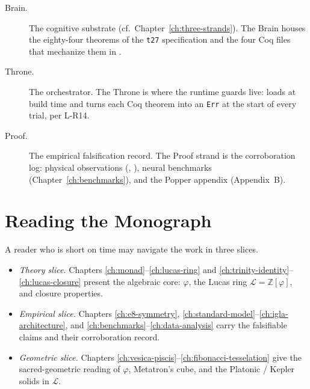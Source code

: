 \begin{description}
  \item[Brain.] The cognitive substrate (cf.\ Chapter~\ref{ch:three-strands}).
        The Brain houses the eighty-four theorems of the
        \texttt{t27} specification \cite{t27spec} and the four Coq
        files that mechanize them in
        \href{https://github.com/gHashTag/trinity-clara/tree/main/proofs/igla}{}.
  \item[Throne.] The orchestrator. The Throne is where the runtime
        guards live: 
        loads  at build time
        and turns each Coq theorem into an \texttt{Err} at the start
        of every trial, per L-R14.
  \item[Proof.] The empirical falsification record. The Proof strand
        is the corroboration log: physical observations
        (\citealp{coldea2010}, \citealp{shechtman1984}), neural
        benchmarks (Chapter~\ref{ch:benchmarks}), and the Popper
        appendix (Appendix~B).
\end{description}

\section{Reading the Monograph}

A reader who is short on time may navigate the work in three slices.

\begin{itemize}
  \item \emph{Theory slice.} Chapters \ref{ch:monad}--\ref{ch:lucas-ring}
        and \ref{ch:trinity-identity}--\ref{ch:lucas-closure} present
        the algebraic core: \(\varphi\), the Lucas ring \(\mathcal{L} = \mathbb{Z}[\varphi]\),
        and closure properties.
  \item \emph{Empirical slice.} Chapters \ref{ch:e8-symmetry},
        \ref{ch:standard-model}--\ref{ch:igla-architecture}, and
        \ref{ch:benchmarks}--\ref{ch:data-analysis} carry the
        falsifiable claims and their corroboration record.
  \item \emph{Geometric slice.} Chapters \ref{ch:vesica-piscis}--\ref{ch:fibonacci-tesselation}
        give the sacred-geometric reading of \(\varphi\), Metatron's
        cube, and the Platonic / Kepler solids in \(\mathcal{L}\).
\end{itemize}

